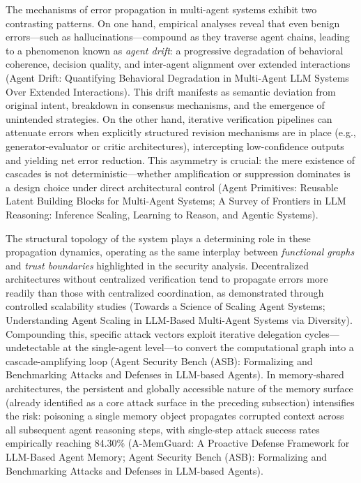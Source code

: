 \documentclass[11pt,a4paper]{article}
\begin{document}
The mechanisms of error propagation in multi-agent systems exhibit two contrasting patterns. On one hand, empirical analyses reveal that even benign errors---such as hallucinations---compound as they traverse agent chains, leading to a phenomenon known as \emph{agent drift}: a progressive degradation of behavioral coherence, decision quality, and inter-agent alignment over extended interactions (Agent Drift: Quantifying Behavioral Degradation in Multi-Agent LLM Systems Over Extended Interactions). This drift manifests as semantic deviation from original intent, breakdown in consensus mechanisms, and the emergence of unintended strategies. On the other hand, iterative verification pipelines can attenuate errors when explicitly structured revision mechanisms are in place (e.g., generator-evaluator or critic architectures), intercepting low-confidence outputs and yielding net error reduction. This asymmetry is crucial: the mere existence of cascades is not deterministic---whether amplification or suppression dominates is a design choice under direct architectural control (Agent Primitives: Reusable Latent Building Blocks for Multi-Agent Systems; A Survey of Frontiers in LLM Reasoning: Inference Scaling, Learning to Reason, and Agentic Systems).

The structural topology of the system plays a determining role in these propagation dynamics, operating as the same interplay between \emph{functional graphs} and \emph{trust boundaries} highlighted in the security analysis. Decentralized architectures without centralized verification tend to propagate errors more readily than those with centralized coordination, as demonstrated through controlled scalability studies (Towards a Science of Scaling Agent Systems; Understanding Agent Scaling in LLM-Based Multi-Agent Systems via Diversity). Compounding this, specific attack vectors exploit iterative delegation cycles---undetectable at the single-agent level---to convert the computational graph into a cascade-amplifying loop (Agent Security Bench (ASB): Formalizing and Benchmarking Attacks and Defenses in LLM-based Agents). In memory-shared architectures, the persistent and globally accessible nature of the memory surface (already identified as a core attack surface in the preceding subsection) intensifies the risk: poisoning a single memory object propagates corrupted context across all subsequent agent reasoning steps, with single-step attack success rates empirically reaching 84.30\% (A-MemGuard: A Proactive Defense Framework for LLM-Based Agent Memory; Agent Security Bench (ASB): Formalizing and Benchmarking Attacks and Defenses in LLM-based Agents).
\end{document}
